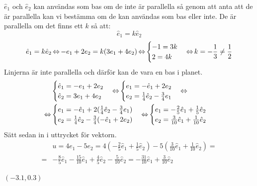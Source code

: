 \begin{task}{2.23}
	$\hat{e}_1$ och $\hat{e}_2$ kan användas som bas om de inte är parallella så genom att anta att de är parallella kan vi bestämma om de kan användas som bas eller inte. De är parallella om det finns ett $k$ så att:
	\[\hat{e}_1=k\hat{e}_2\] 
	\[\hat{e}_1=k\hat{e}_2 \operatorname{\Leftrightarrow}
	-e_1+2e_2=k(3e_1+4e_2) \operatorname{\Leftrightarrow}
	\begin{cases}
		-1=3k \\
		2=4k
	\end{cases} \operatorname{\Leftrightarrow}
	k=-\frac{1}{3}\neq\frac{1}{2}\]
	Linjerna är inte parallella och därför kan de vara en bas i planet.
	\begin{align*}
		&\begin{cases}
			\hat{e}_1=-e_1+2e_2 \\
			\hat{e}_2=3e_1+4e_2
		\end{cases} \operatorname{\Leftrightarrow}
		\begin{cases}
			e_1=-\hat{e}_1+2e_2 \\
			e_2=\frac{1}{4}\hat{e}_2-\frac{3}{4}e_1
		\end{cases}\operatorname{\Leftrightarrow} \\ \operatorname{\Leftrightarrow}
		&\begin{cases}
			e_1=-\hat{e}_1+2(\frac{1}{4}\hat{e}_2-\frac{3}{4}e_1) \\
			e_2=\frac{1}{4}\hat{e}_2-\frac{3}{4}(-\hat{e}_1+2e_2)
		\end{cases}\operatorname{\Leftrightarrow}
		\begin{cases}
			e_1=-\frac{2}{5}\hat{e}_1+\frac{1}{5}\hat{e}_2 \\
			e_2=\frac{3}{10}\hat{e}_1+\frac{1}{10}\hat{e}_2
		\end{cases}
	\end{align*}
	Sätt sedan in i uttrycket för vektorn.
	\begin{align*}
		&u=4e_1-5e_2=
		4(-\frac{2}{5}\hat{e}_1+\frac{1}{5}\hat{e}_2)-5(\frac{3}{10}\hat{e}_1+\frac{1}{10}\hat{e}_2)= \\ =
		&-\frac{8}{5}\hat{e}_1-\frac{15}{10}\hat{e}_1+\frac{4}{5}\hat{e}_2-\frac{5}{10}\hat{e}_2=
		-\frac{31}{10}\hat{e}_1+\frac{3}{10}\hat{e}_2
	\end{align*}
	
	\ans $(-3.1,0.3)$
\end{task}

